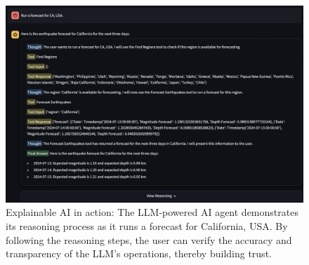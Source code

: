 \begin{figure}[hbtp]
    \centering
    \includegraphics[scale=0.35]{img/explainable-ai-agent.png}
    \captionsetup{format=hang}
    \caption{\label{fig:explainable-ai}Explainable AI in action:
        The \ac{LLM}-powered AI agent demonstrates its reasoning process as
        it runs a forecast for California, USA. By following the
        reasoning steps, the user can verify the accuracy and
        transparency of the \ac{LLM}'s operations, thereby building trust.}
\end{figure}


